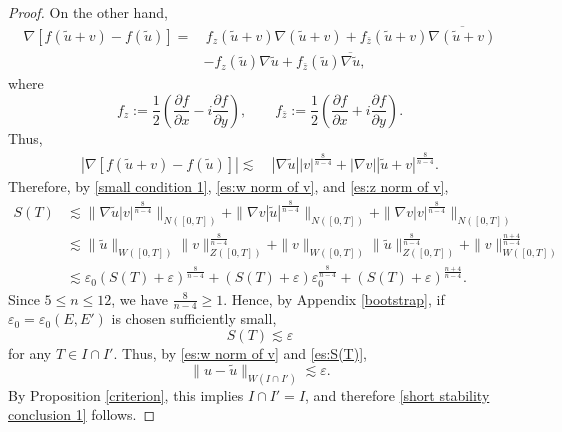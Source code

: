 \documentclass[11pt,a4paper]{article}
\numberwithin{equation}{section}
\begin{document}
\begin{proof}
On the other hand,
\begin{align*}
\nabla \left[f(\tilde{u} + v) - f(\tilde{u})\right]
= &\, f_{z}(\tilde{u} + v)\nabla(\tilde{u} + v) + f_{\bar{z}}(\tilde{u} + v)\overline{\nabla(\tilde{u} + v)} \\
&-f_{z}(\tilde{u})\nabla\tilde{u} + f_{\bar{z}}(\tilde{u})\overline{\nabla\tilde{u}},
\end{align*}
where
\[
f_{z} := \dfrac{1}{2}\left(\dfrac{\partial f}{\partial x} -i \dfrac{\partial f}{\partial y}\right),\qquad
f_{\bar{z}} := \dfrac{1}{2}\left(\dfrac{\partial f}{\partial x} +i \dfrac{\partial f}{\partial y}\right).
\]
Thus,
\begin{equation}\label{nonlinear with delivative}
\begin{aligned}
\left|\nabla \left[f(\tilde{u} + v) - f(\tilde{u})\right]\right|
\lesssim\ &|\nabla \tilde{u}||v|^{\frac{8}{n-4}} + |\nabla v||\tilde{u} + v|^{\frac{8}{n-4}}.
\end{aligned}
\end{equation}
Therefore, by \eqref{small condition 1}, \eqref{es:w norm of v}, and \eqref{es:z norm of v},
\begin{equation}
\begin{aligned}
S(T)
&\lesssim \| \nabla \tilde{u}|v|^{\frac{8}{n-4}}\|_{N([0,T])}
+ \|\nabla v |\tilde{u}|^{\frac{8}{n-4}}\|_{N([0,T])}
+ \|\nabla v|v|^{\frac{8}{n-4}}\|_{N([0,T])} \\
&\lesssim \|\tilde{u}\|_{W([0,T])}\|v\|_{Z([0,T])}^{\frac{8}{n-4}}
+ \|v\|_{W([0,T])}\|\tilde{u}\|_{Z([0,T])}^{\frac{8}{n-4}}
+ \|v\|_{W([0,T])}^{\frac{n+4}{n-4}} \\
&\lesssim \varepsilon_{0}(S(T) + \varepsilon)^{\frac{8}{n-4}}
+ (S(T) + \varepsilon)\varepsilon_{0}^{\frac{8}{n-4}}
+ (S(T) + \varepsilon)^{\frac{n + 4}{n-4}}.
\end{aligned}
\end{equation}
Since $5 \leq n \leq 12$, we have $\frac{8}{n - 4} \geq 1$. Hence, by Appendix \ref{bootstrap}, if $\varepsilon_{0} = \varepsilon_{0}(E, E')$ is chosen sufficiently small,
\begin{equation}\label{es:S(T)}
S(T) \lesssim \varepsilon
\end{equation}
for any $T \in I \cap I'$.
Thus, by \eqref{es:w norm of v} and \eqref{es:S(T)},
\[
 \|u - \tilde{u}\|_{W(I \cap I')} \lesssim \varepsilon.
\]
By Proposition \ref{criterion}, this implies $I \cap I' = I$, and therefore \eqref{short stability conclusion 1} follows.


\end{proof}
\end{document}
